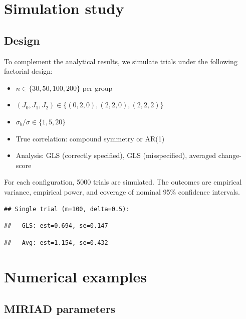 \documentclass[
  11pt,
]{article}
\providecommand{\tightlist}{%
  \setlength{\itemsep}{0pt}\setlength{\parskip}{0pt}}
\begin{document}
\section{Simulation study}\label{simulation-study}

\subsection{Design}\label{design}

To complement the analytical results, we simulate trials under the
following factorial design:

\begin{itemize}
\tightlist
\item
  \(n \in \{30, 50, 100, 200\}\) per group
\item
  \((J_0, J_1, J_2) \in \{(0,2,0), (2,2,0), (2,2,2)\}\)
\item
  \(\sigma_b/\sigma \in \{1, 5, 20\}\)
\item
  True correlation: compound symmetry or AR(1)
\item
  Analysis: GLS (correctly specified), GLS (misspecified), averaged
  change-score
\end{itemize}

For each configuration, 5000 trials are simulated. The outcomes are
empirical variance, empirical power, and coverage of nominal 95\%
confidence intervals.

\begin{verbatim}
## Single trial (m=100, delta=0.5):
\end{verbatim}

\begin{verbatim}
##   GLS: est=0.694, se=0.147
\end{verbatim}

\begin{verbatim}
##   Avg: est=1.154, se=0.432
\end{verbatim}

\section{Numerical examples}\label{numerical-examples}

\subsection{MIRIAD parameters}\label{miriad-parameters}
\end{document}
